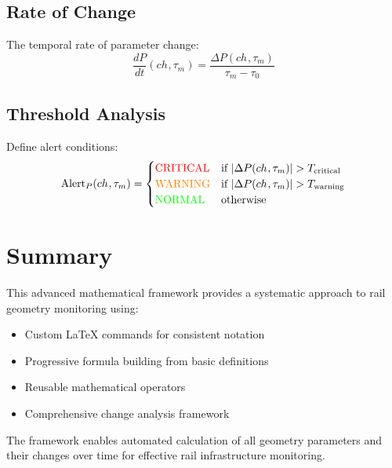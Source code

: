 \documentclass{article}
\newcommand{\time}[1]{\tau_{#1}}
\newcommand{\chainage}[1]{ch_{#1}}
\begin{document}
\subsection{Rate of Change}
The temporal rate of parameter change:
\begin{equation}
\frac{dP}{dt}(\chainage{}, \time{m}) = \frac{\Delta P(\chainage{}, \time{m})}{\time{m} - \time{0}}
\end{equation}

\subsection{Threshold Analysis}
Define alert conditions:
\begin{equation}
\text{Alert}_P(\chainage{}, \time{m}) = \begin{cases}
\textcolor{red}{\text{CRITICAL}} & \text{if } |\Delta P(\chainage{}, \time{m})| > T_{\text{critical}} \\
\textcolor{orange}{\text{WARNING}} & \text{if } |\Delta P(\chainage{}, \time{m})| > T_{\text{warning}} \\
\textcolor{green}{\text{NORMAL}} & \text{otherwise}
\end{cases}
\end{equation}

\section{Summary}
This advanced mathematical framework provides a systematic approach to rail geometry monitoring using:
\begin{itemize}
\item Custom LaTeX commands for consistent notation
\item Progressive formula building from basic definitions
\item Reusable mathematical operators
\item Comprehensive change analysis framework
\end{itemize}

The framework enables automated calculation of all geometry parameters and their changes over time for effective rail infrastructure monitoring.
\end{document}
